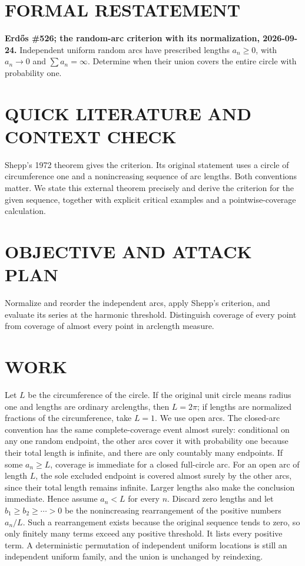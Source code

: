 \section{FORMAL RESTATEMENT}
\textbf{Erd\H{o}s \#526; the random-arc criterion with its normalization, 2026-09-24.}
Independent uniform random arcs have prescribed lengths $a_n\geq0$, with $a_n\to0$ and $\sum a_n=\infty$. Determine when their union covers the entire circle with probability one.

\section{QUICK LITERATURE AND CONTEXT CHECK}
Shepp's 1972 theorem gives the criterion. Its original statement uses a circle of circumference one and a nonincreasing sequence of arc lengths. Both conventions matter. We state this external theorem precisely and derive the criterion for the given sequence, together with explicit critical examples and a pointwise-coverage calculation.

\section{OBJECTIVE AND ATTACK PLAN}
Normalize and reorder the independent arcs, apply Shepp's criterion, and evaluate its series at the harmonic threshold. Distinguish coverage of every point from coverage of almost every point in arclength measure.

\section{WORK}
Let $L$ be the circumference of the circle. If the original unit circle means radius one and lengths are ordinary arclengths, then $L=2\pi$; if lengths are normalized fractions of the circumference, take $L=1$. We use open arcs. The closed-arc convention has the same complete-coverage event almost surely: conditional on any one random endpoint, the other arcs cover it with probability one because their total length is infinite, and there are only countably many endpoints. If some $a_n\geq L$, coverage is immediate for a closed full-circle arc. For an open arc of length $L$, the sole excluded endpoint is covered almost surely by the other arcs, since their total length remains infinite. Larger lengths also make the conclusion immediate. Hence assume $a_n<L$ for every $n$.
Discard zero lengths and let $b_1\geq b_2\geq\cdots>0$ be the nonincreasing rearrangement of the positive numbers $a_n/L$. Such a rearrangement exists because the original sequence tends to zero, so only finitely many terms exceed any positive threshold. It lists every positive term. A deterministic permutation of independent uniform locations is still an independent uniform family, and the union is unchanged by reindexing.

